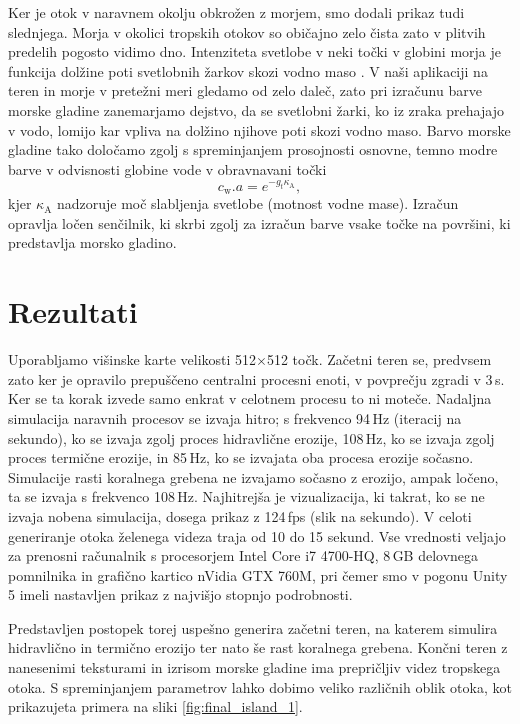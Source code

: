 \documentclass[9pt]{pnas-new}
\newcommand{\const}[1]{{\ensuremath{\kappa_\mathrm{#1}}}}
\begin{document}
Ker je otok v naravnem okolju obkrožen z morjem, smo dodali prikaz tudi slednjega. Morja v okolici tropskih otokov so običajno zelo čista zato v plitvih predelih pogosto vidimo dno. Intenziteta svetlobe v neki točki v globini morja je funkcija dolžine poti svetlobnih žarkov skozi vodno maso \cite{nakamura_reef_model_07}. V naši aplikaciji na teren in morje v pretežni meri gledamo od zelo daleč, zato pri izračunu barve morske gladine zanemarjamo dejstvo, da se svetlobni žarki, ko iz zraka prehajajo v vodo, lomijo kar vpliva na dolžino njihove poti skozi vodno maso. Barvo morske gladine tako določamo zgolj s spreminjanjem prosojnosti osnovne, temno modre barve v odvisnosti globine vode v obravnavani točki 
\begin{equation} \label{eq:beers_law}
c_\mathrm{w}.a = e^{-g_t\const{A}},
\end{equation}
kjer $\const{A}$ nadzoruje moč slabljenja svetlobe (motnost vodne mase). Izračun opravlja ločen senčilnik, ki skrbi zgolj za izračun barve vsake točke na površini, ki predstavlja morsko gladino.

\section*{Rezultati}

Uporabljamo višinske karte velikosti 512$\times$512 točk. Začetni teren se, predvsem zato ker je opravilo prepuščeno centralni procesni enoti, v povprečju zgradi v 3\,s. Ker se ta korak izvede samo enkrat v celotnem procesu to ni moteče. Nadaljna simulacija naravnih procesov se izvaja hitro; s frekvenco 94\,Hz (iteracij na sekundo), ko se izvaja zgolj proces hidravlične erozije, 108\,Hz, ko se izvaja zgolj proces termične erozije, in 85\,Hz, ko se izvajata oba procesa erozije sočasno. Simulacije rasti koralnega grebena ne izvajamo sočasno z erozijo, ampak ločeno, ta se izvaja s frekvenco 108\,Hz. Najhitrejša je vizualizacija, ki takrat, ko se ne izvaja nobena simulacija, dosega prikaz z 124\,fps (slik na sekundo). V celoti generiranje otoka želenega videza traja od 10 do 15 sekund. Vse vrednosti veljajo za prenosni računalnik s procesorjem Intel Core i7 4700-HQ, 8\,GB delovnega pomnilnika in grafično kartico nVidia GTX 760M, pri čemer smo v pogonu Unity 5 imeli nastavljen prikaz z najvišjo stopnjo podrobnosti.

Predstavljen postopek torej uspešno generira začetni teren, na katerem simulira hidravlično in termično erozijo ter nato še rast koralnega grebena. Končni teren z nanesenimi teksturami in izrisom morske gladine ima prepričljiv videz tropskega otoka. S spreminjanjem parametrov lahko dobimo veliko različnih oblik otoka, kot prikazujeta primera na sliki \ref{fig:final_island_1}.
\end{document}

